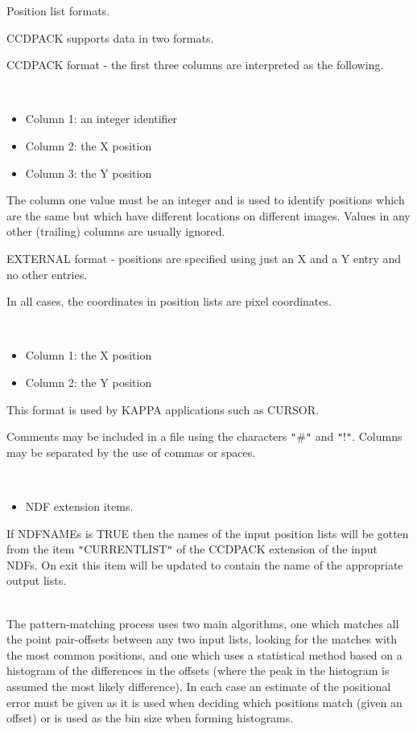 \documentclass[twoside,11pt]{article}
\newcommand{\xref}[3]{#1}
\renewcommand{\_}{\texttt{\symbol{95}}}
\newcommand{\qt}[1]{{\tt "}#1{\tt "}}
\newcommand{\sstdiytopic}[2]{\item[#1:] \mbox{} \\[1.3ex] #2}
\newcommand{\sstitemlist}[1]{
  \mbox{} \\
  \vspace{-3.5ex}
  \begin{itemize}
     #1
  \end{itemize}
}
\newcommand{\sstitem}{\item}
\newcommand{\sstdiytopic}[2]{\item[{#1}] #2 }
\newcommand{\sstitemlist}[1]{
      \begin{itemize}
         #1
      \end{itemize}
      \\
   }
\newcommand{\sstitem}{\item}
\begin{document}
{{{         \sstitem
         Position list formats.

      }
        CCDPACK supports data in two formats.

        CCDPACK format - the first three columns are interpreted as the
        following.

      \sstitemlist{

         \sstitem
              Column 1: an integer identifier

         \sstitem
              Column 2: the X position

         \sstitem
              Column 3: the Y position

      }
        The column one value must be an integer and is used to identify
        positions which are the same but which have different locations
        on different images. Values in any other (trailing) columns are
        usually ignored.

        EXTERNAL format - positions are specified using just an X
        and a Y entry and no other entries.

        In all cases, the coordinates in position lists are pixel
        coordinates.

      \sstitemlist{

         \sstitem
              Column 1: the X position

         \sstitem
              Column 2: the Y position

      }
        This format is used by KAPPA applications such as
        \xref{CURSOR}{sun95}{CURSOR}.

        Comments may be included in a file using the characters \qt{\#} and
        \qt{!}. Columns may be separated by the use of commas or spaces.

      \sstitemlist{

         \sstitem
         NDF extension items.

      }
        If NDFNAMEs is TRUE then the names of the input position lists
        will be gotten from the item \qt{CURRENT\_LIST} of the CCDPACK
        extension of the input NDFs. On exit this item will be updated
        to contain the name of the appropriate output lists.
   }
   \sstdiytopic{
      Notes on Algorithms
   } {
      The pattern-matching process uses two main algorithms, one which
      matches all the point pair-offsets between any two input lists,
      looking for the matches with the most common positions, and one
      which uses a statistical method based on a histogram of the
      differences in the offsets (where the peak in the histogram is
      assumed the most likely difference). In each case an estimate of
      the positional error must be given as it is used when deciding
      which positions match (given an offset) or is used as the bin
      size when forming histograms.

}}
\end{document}
